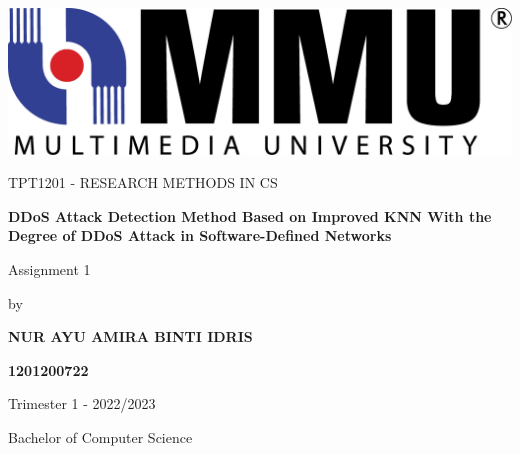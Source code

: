 \documentclass[12pt]{report}
\begin{document}
\singlespacing

\begin{titlepage}
   \begin{center}

        \vspace*{1.5cm}
    
        \includegraphics[scale=0.3]{mmu-logo.png}
    
       \vspace{1cm}

        \Large
        
       TPT1201 - RESEARCH METHODS IN CS

       \LARGE

       \vspace{1cm}

       \textbf{DDoS Attack Detection Method Based on Improved KNN With the Degree of DDoS Attack in Software-Defined Networks}

       \vspace{1cm}

       Assignment 1

       \vspace{1cm}

       by

       \vspace{1cm}

       \textbf{NUR AYU AMIRA BINTI IDRIS}

       \vspace{1cm}

       \textbf{1201200722}

        \vspace{1cm}

        Trimester 1 - 2022/2023

        \vspace{1cm}

        Bachelor of Computer Science
            
   \end{center}
\end{titlepage}
\end{document}
